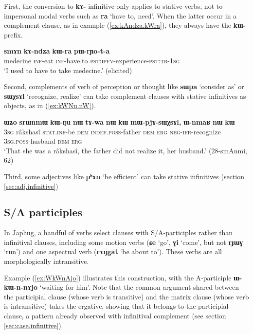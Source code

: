 \documentclass[oneside,a4paper,11pt]{article}
\newcommand{\ipa}[1]{\textbf{\phon#1}} %
\newcommand{\jpg}[2]{\ipa{#1} `#2'} %
\begin{document}
 First, the conversion to \ipa{kɤ-} infinitive only applies to stative verbs, not to  impersonal modal verbs such as \jpg{ra}{have to, need}. When the latter occur in a complement clause, as in example (\ref{ex:kAndza.kWra}), they always have the \ipa{kɯ-} prefix.

\begin{exe}
\ex \label{ex:kAndza.kWra}
\gll 
\ipa{smɤn} 	\ipa{kɤ-ndza} 	\ipa{kɯ-ra} 	\ipa{pɯ-rɲo-t-a} \\ 
medecine \textsc{inf}-eat \textsc{inf}-have.to  \textsc{pst:ipfv}-experience-\textsc{pst:tr-1sg} \\
\glt  `I used to have to take medecine.' (elicited)
\end{exe}
 
 Second, complements of verb of perception or thought like \jpg{sɯpa}{consider as} or \jpg{sɯχsɤl}{recognize, realize} can take complement clauses with stative infinitives as objects, as in (\ref{ex:kWNu.nW}).
\begin{exe}
\ex \label{ex:kWNu.nW}
\gll \ipa{ɯʑo} 	\ipa{srɯnmɯ} 	\ipa{kɯ-ŋu} 	\ipa{nɯ} 	\ipa{tɤ-wa} 	\ipa{nɯ} 	\ipa{kɯ} 	\ipa{mɯ-pjɤ-sɯχsɤl,} 	\ipa{ɯ-nmaʁ} 	\ipa{nɯ} 	\ipa{kɯ} \\
\textsc{3sg} râkshasî \textsc{stat.inf}-be \textsc{dem} \textsc{indef.poss}-father \textsc{dem} \textsc{erg} \textsc{neg-ifr}-recognize \textsc{3sg.poss}-husband \textsc{dem} \textsc{erg} \\
\glt  `That she was a râkshasî, the father did not realize it, her husband.' (28-smAnmi, 62)
\end{exe}

Third, some adjectives like \jpg{pʰɤn}{be efficient} can take stative infinitives (section \ref{sec:adj.infinitive})

 \subsection{S/A participles} \label{sec:SApart}
In Japhug, a handful of verbs select clauses with S/A-participles rather than infinitival clauses, including  some motion verbs (\jpg{ɕe}{go}, \jpg{ɣi}{come}, but not \jpg{rɟɯɣ}{run}) and one aspectual verb  (\jpg{rɤŋgat}{be about to}). These verbs are all morphologically intransitive.

Example (\ref{ex:WkWnAjo}) illustrates this construction, with the A-participle \ipa{ɯ-kɯ-n-nɤjo} `waiting for him'. Note that the common argument shared between the participial clause (whose verb is transitive) and the matrix clause (whose verb is intransitive) takes the ergative, showing that it belongs to the participial clause, a pattern already observed with infinitival complement (see section \ref{sec:case.infinitive}).
\end{document}
